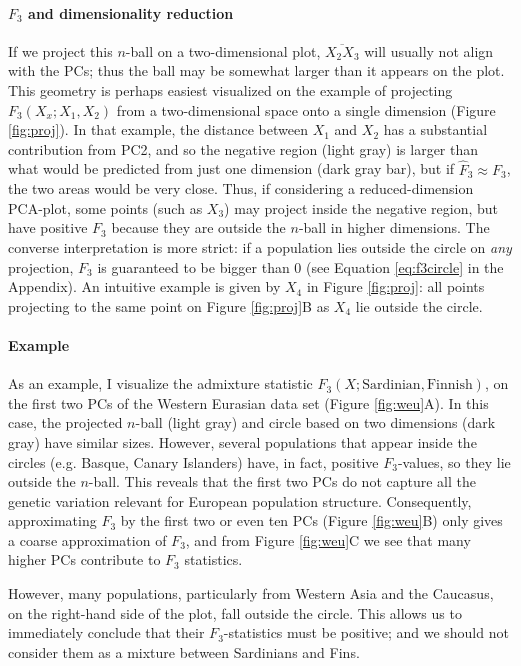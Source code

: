 \documentclass[12pt,fullpage, a4paper]{article}
\begin{document}
\paragraph{$F_3$ and dimensionality reduction} 
 If we project this $n$-ball on a two-dimensional plot, $\overline{X_2X_3}$ will usually not align with the PCs; thus the ball may be somewhat larger than it appears on the plot. This geometry is perhaps easiest visualized on the example of projecting $F_3(X_x; X_1, X_2)$ from a two-dimensional space onto a single dimension (Figure \ref{fig:proj}). In that example, the distance between $X_1$ and $X_2$ has a substantial contribution from PC2, and so the negative region (light gray) is larger than what would be predicted from just one dimension (dark gray bar), but if $\hat{F}_3 \approx F_3$, the two areas would be very close. Thus, if considering a reduced-dimension PCA-plot, some points (such as $X_3$) may project inside the negative region, but have positive $F_3$ because they are outside the $n$-ball in higher dimensions. The converse interpretation is more strict: if a population lies outside the circle on \emph{any} projection, $F_3$ is guaranteed to be bigger than 0 (see Equation \ref{eq:f3circle} in the Appendix). An intuitive example is given by $X_4$ in Figure \ref{fig:proj}: all points projecting to the same point on Figure \ref{fig:proj}B as $X_4$ lie outside the circle.

\paragraph{Example}
As an example, I visualize the admixture statistic $F_3(X; \text{Sardinian}, \text{Finnish})$, on the first two PCs of the Western Eurasian data set (Figure \ref{fig:weu}A). In this case, the projected $n$-ball (light gray) and circle based on two dimensions (dark gray) have similar sizes. However, several populations that appear inside the circles (e.g. Basque, Canary Islanders) have, in fact, positive $F_3$-values, so they lie outside the $n$-ball. This reveals that the first two PCs do not capture all the genetic variation relevant for  European population structure.  Consequently, approximating $F_3$ by the first two or even ten PCs (Figure \ref{fig:weu}B) only gives a coarse approximation of $F_3$, and from Figure \ref{fig:weu}C we see that many higher PCs contribute to $F_3$ statistics.

However, many populations, particularly from Western Asia and the Caucasus, on the right-hand side of the plot, fall outside the circle. This allows us to immediately conclude that their $F_3$-statistics must be positive; and we should not consider them as a mixture between Sardinians and Fins.
\end{document}
